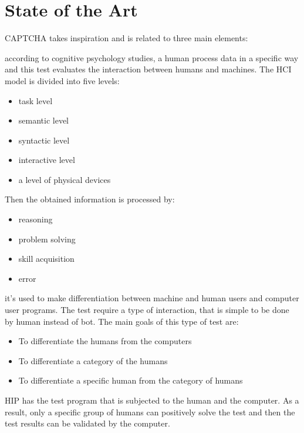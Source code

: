 \chapter{State of the Art}\label{chapter:StateOfArt}
CAPTCHA takes inspiration and is related to three main elements\cite{types_CAPTCHA}:
\begin{enumerate}
{according to cognitive psychology studies, a human process data in a specific way and this test evaluates the interaction between humans and machines. The HCI model is divided into five levels:
\begin{itemize}
	\item{task level}
	\item{semantic level}
	\item{syntactic level}
	\item{interactive level}
	\item{a level of physical devices}
\end{itemize}   
Then the obtained information is processed by:
\begin{itemize}
	\item{reasoning}
	\item{problem solving}
	\item{skill acquisition}
	\item{error}
\end{itemize}   
}
{it's used to make differentiation between machine and human users and computer user programs. The test require a type of interaction, that is simple to be done by human instead of bot. The main goals of this type of test are:
\begin{itemize}
	\item{To differentiate the humans from the computers}
	\item{To differentiate a category of the humans}
	\item{To differentiate a specific human from the category of humans}
\end{itemize}
HIP has the test program that is subjected to the human and the computer. As a result, only a specific group of humans can positively solve the test and then the test results can be validated by the computer.}
\end{enumerate}
